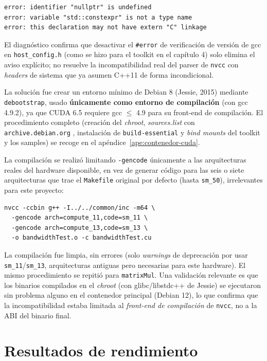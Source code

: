 \begin{lstlisting}[style=bash]
error: identifier "nullptr" is undefined
error: variable "std::constexpr" is not a type name
error: this declaration may not have extern "C" linkage
\end{lstlisting}

El diagnóstico confirma que desactivar el \texttt{\#error} de verificación de versión de gcc en \texttt{host\_config.h} (como se hizo para el toolkit en el capítulo 4) solo elimina el aviso explícito; no resuelve la incompatibilidad real del parser de \texttt{nvcc} con \textit{headers} de sistema que ya asumen C++11 de forma incondicional.

La solución fue crear un entorno mínimo de Debian 8 (Jessie, 2015) mediante \texttt{debootstrap}, usado \textbf{únicamente como entorno de compilación} (con gcc 4.9.2), ya que CUDA 6.5 requiere gcc $\leq$ 4.9 para su front-end de compilación. El procedimiento completo (creación del \textit{chroot}, \textit{sources.list} con \texttt{archive.debian.org} \cite{debian_archive}, instalación de \texttt{build-essential} y \textit{bind mounts} del toolkit y los samples) se recoge en el apéndice~\ref{ape:contenedor-cuda}.

La compilación se realizó limitando \texttt{-gencode} únicamente a las arquitecturas reales del hardware disponible, en vez de generar código para las seis o siete arquitecturas que trae el \texttt{Makefile} original por defecto (hasta \texttt{sm\_50}), irrelevantes para este proyecto:

\begin{lstlisting}[style=bash]
nvcc -ccbin g++ -I../../common/inc -m64 \
  -gencode arch=compute_11,code=sm_11 \
  -gencode arch=compute_13,code=sm_13 \
  -o bandwidthTest.o -c bandwidthTest.cu
\end{lstlisting}

La compilación fue limpia, sin errores (solo \textit{warnings} de deprecación por usar \texttt{sm\_11}/\texttt{sm\_13}, arquitecturas antiguas pero necesarias para este hardware). El mismo procedimiento se repitió para \texttt{matrixMul}. Una validación relevante es que los binarios compilados en el \textit{chroot} (con glibc/libstdc++ de Jessie) se ejecutaron sin problema alguno en el contenedor principal (Debian 12), lo que confirma que la incompatibilidad estaba limitada al \textit{front-end de compilación} de \texttt{nvcc}, no a la ABI del binario final.

\section{Resultados de rendimiento}

